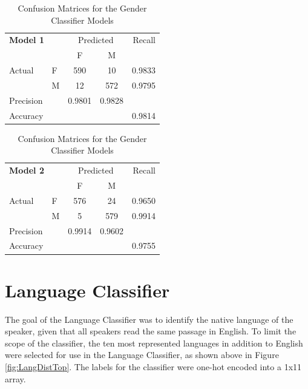\begin{table}[h]
\begin{center}
\caption{Confusion Matrices for the Gender Classifier Models}
\begin{tabular}{l l | c c r }
\multicolumn{2}{l}{\textbf{Model 1}} & \multicolumn{2}{c}{Predicted} & Recall \\
& & F & M &  \\ 
\cline{2-5}
Actual & F & 590 &  10 & 0.9833 \\
& M & 12 & 572 & 0.9795 \\  \hline
Precision&  & 0.9801 & 0.9828 \\ 
Accuracy & & &  & 0.9814 \\
\end{tabular}
\begin{tabular}{l l | c c r }
\multicolumn{2}{l}{\textbf{Model 2}} & \multicolumn{2}{c}{Predicted} & Recall \\
& & F& M &  \\ 
\cline{2-5}
Actual & F & 576 &  24 & 0.9650 \\
& M & 5 & 579 & 0.9914 \\  \hline
Precision&  & 0.9914 & 0.9602 \\ 
Accuracy & & &  & 0.9755 \\
\end{tabular}
\label{tab:GenConfusion}
\end{center}
\end{table} 



\section{Language Classifier}

The goal of the Language Classifier was to identify the native language of the speaker, given that all speakers read the same passage in English. To limit the scope of the classifier, the ten most represented languages in addition to English were selected for use in the Language Classifier, as shown above in Figure \ref{fig:LangDistTop}. The labels for the classifier were one-hot encoded into a 1x11 array.

